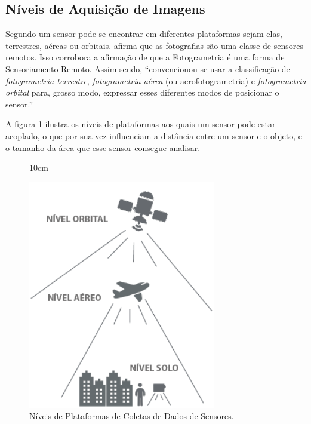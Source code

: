 \subsection{Níveis de Aquisição de Imagens}
Segundo  um sensor pode se encontrar em diferentes plataformas sejam elas, terrestres, aéreas ou orbitais.
 afirma que as fotografias são uma classe de sensores remotos. Isso corrobora a afirmação de que a Fotogrametria é uma forma de Sensoriamento Remoto. Assim sendo, ``convencionou-se usar a classificação de \textit{fotogrametria terrestre}, \textit{fotogrametria aérea} (ou aerofotogrametria) e \textit{fotogrametria orbital} para, grosso modo, expressar esses diferentes modos de posicionar o sensor.'' \cite[p. 18]{coelho2007fotogrametria}

A figura \ref{niveis_sr} ilustra os níveis de plataformas aos quais um sensor pode estar acoplado, o que por sua vez influenciam a distância entre um sensor e o objeto, e o tamanho da área que esse sensor consegue analisar. 

\begin{figure}[!ht]{10cm}
  \caption{Níveis de Plataformas de Coletas de Dados de Sensores.} \label{niveis_sr}
  \includegraphics[width=0.5\hsize]{figuras/niveis_sr.png}
\end{figure}

